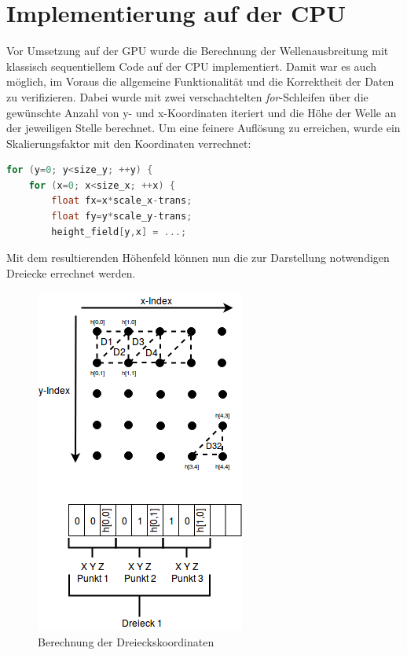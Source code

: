 \documentclass[conference]{IEEEtran}
\begin{document}
\section{Implementierung auf der CPU}

Vor Umsetzung auf der GPU wurde die Berechnung der Wellenausbreitung mit klassisch sequentiellem Code auf der CPU implementiert. Damit war es auch m\"oglich, im Voraus die allgemeine Funktionalit\"at und die Korrektheit der Daten zu verifizieren. Dabei wurde mit zwei verschachtelten \textit{for}-Schleifen \"uber die gew\"unschte Anzahl von y- und x-Koordinaten iteriert und die H\"ohe der Welle an der jeweiligen Stelle berechnet. Um eine feinere Aufl\"osung zu erreichen, wurde ein Skalierungsfaktor mit den Koordinaten verrechnet:

\begin{lstlisting}[language=c, caption=Berechnung des H\"ohenfeldes auf der CPU - Pseudo-Code, captionpos=b]
for (y=0; y<size_y; ++y) {
	for (x=0; x<size_x; ++x) {
		float fx=x*scale_x-trans;
		float fy=y*scale_y-trans;
		height_field[y,x] = ...;
\end{lstlisting}

Mit dem resultierenden H\"ohenfeld k\"onnen nun die zur Darstellung notwendigen Dreiecke errechnet werden.

\begin{figure}[H]
\centerline{\includegraphics[scale=0.75]{img/triangle_coords_calculation.png}}
\label{fig:triangle_coords_calculation}
\caption{Berechnung der Dreieckskoordinaten}
\end{figure}
\end{document}
